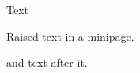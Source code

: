 \documentclass{article}
\begin{document}
\noindent Text \begin{minipage}[b]{4cm}
Raised text in a minipage.

\vspace{1cm}
\end{minipage} and text after it.
\end{document}
